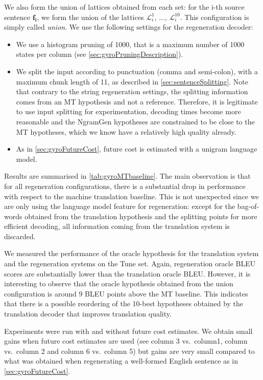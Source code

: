 We also form the union of lattices
obtained from each set:
for the i-th source sentence $\bm{f_i}$, we form the union
of the lattices $\mathcal{L}_i^1$, ..., $\mathcal{L}_i^{10}$.
This configuration is simply
called \emph{union}.
We use the following settings for the regeneration decoder:
%
\begin{itemize}
  \item We use a histogram pruning of 1000, that is a maximum number of 1000 states
    per column (see \autoref{sec:gyroPruningDescription}).
  \item We split the input according to punctuation (comma and semi-colon), with
    a maximum chunk length of 11, as described in \autoref{sec:sentenceSplitting}.
    Note that contrary to the string regeneration settings, the splitting information
    comes from an MT hypothesis and not a reference. Therefore, it is legitimate
    to use input splitting for experimentation, decoding times become more
    reasonable and the NgramGen hypotheses are constrained to be close to
    the MT hypotheses, which we know have a relatively high quality already.
  \item As in \autoref{sec:gyroFutureCost}, future cost is estimated with a unigram language model.
\end{itemize}
%
Results are summarised in \autoref{tab:gyroMTbaseline}.
The main observation is that for all regeneration configurations, there
is a substantial drop in performance with respect
to the machine translation baseline. This is not unexpected
since we are only using the language model feature for regeneration:
except for the bag-of-words obtained from the translation hypothesis and
the splitting points for more efficient decoding, all information coming from the translation system
is discarded.

We measured the performance of the oracle hypothesis %
for the translation system and the regeneration systems on the Tune set.
Again, regeneration oracle BLEU scores are substantially
lower than the translation oracle BLEU.
However, it is interesting to observe that
the oracle hypothesis obtained from the union configuration is
around 9 BLEU points above the MT baseline. This indicates that
there is a possible reordering of the 10-best hypotheses obtained by
the translation decoder that improves translation quality.

Experiments were run with and without future cost estimates.
We obtain small gains when future cost estimates are used (see column 3 vs.\ column1,
column vs.\ column 2 and column 6 vs.\ column 5)
but gains are very small compared to what was obtained
when regenerating a well-formed English sentence as in \autoref{sec:gyroFutureCost}.

